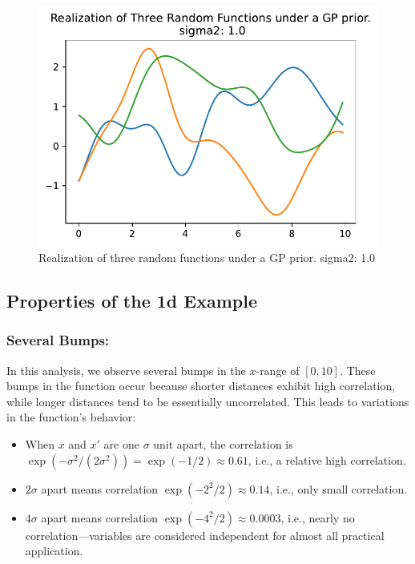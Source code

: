 \documentclass[
  letterpaper,
  DIV=11,
  numbers=noendperiod]{scrreprt}
\providecommand{\tightlist}{%
  \setlength{\itemsep}{0pt}\setlength{\parskip}{0pt}}\usepackage{longtable,booktabs,array}
\begin{document}
\begin{figure}[H]

{\centering \includegraphics{006_num_gp_files/figure-pdf/fig-mvn1-3-output-1.pdf}

}

\caption{\label{fig-mvn1-3}Realization of three random functions under a
GP prior. sigma2: 1.0}

\end{figure}

\hypertarget{properties-of-the-1d-example}{%
\subsection{Properties of the 1d
Example}\label{properties-of-the-1d-example}}

\hypertarget{several-bumps}{%
\subsubsection{Several Bumps:}\label{several-bumps}}

In this analysis, we observe several bumps in the \(x\)-range of
\([0,10]\). These bumps in the function occur because shorter distances
exhibit high correlation, while longer distances tend to be essentially
uncorrelated. This leads to variations in the function's behavior:

\begin{itemize}
\tightlist
\item
  When \(x\) and \(x'\) are one \(\sigma\) unit apart, the correlation
  is
  \(\exp\left(-\sigma^2 / (2\sigma^2)\right) = \exp(-1/2) \approx 0.61\),
  i.e., a relative high correlation.
\item
  \(2\sigma\) apart means correlation \(\exp(− 2^2 /2) \approx 0.14\),
  i.e., only small correlation.
\item
  \(4\sigma\) apart means correlation \(\exp(− 4^2 /2) \approx 0.0003\),
  i.e., nearly no correlation---variables are considered independent for
  almost all practical application.
\end{itemize}
\end{document}
